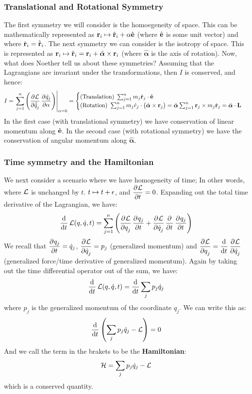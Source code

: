 \documentclass[../PHYS306Notes.tex]{subfiles}
\begin{document}
\subsubsection{Translational and Rotational Symmetry}
The first symmetry we will consider is the homoegeneity of space. This can be mathematically represented as $\mathbf{r}_i \mapsto \tilde{\mathbf{r}}_i + \alpha\hat{\mathbf{e}}$ (where $\hat{\mathbf{e}}$ is some unit vector) and where $\dot{\mathbf{r}}_i = \dot{\tilde{\mathbf{r}}}_i$. 
\newline The next symmetry we can consider is the isotropy of space. This is represented as $\mathbf{r}_i \mapsto \tilde{\mathbf{r}}_i = \mathbf{r}_i + \hat{\bm{\alpha}}\times \mathbf{r}_i$ (where $\hat{\bm{\alpha}}$ is the axis of rotation). 
\newline Now, what does Noether tell us about these symmetries? Assuming that the Lagrangians are invariant under the transformations, then $I$ is conserved, and hence:
\[I = \left.\sum_{j=1}^n\left(\dpd{\LL}{\dot{\tilde{q}}_j}\dpd{\tilde{q}_j}{\alpha}\right)\right|_{\alpha=0} = \begin{cases}
\text{(Translation) } \sum_{j=1}^n m_j\dot{\v{r}}_j \cdot \ehat
\\ \text{(Rotation) } \sum_{j=1}^nm_j\dot{r}_j \cdot\left(\hat{\bm{\alpha}} \times \v{r}_j\right) = \hat{\bm{\alpha}}\sum_{j=1}^n \v{r}_j \times m_j \dot{\v{r}}_j
= \hat{\bm{\alpha}}\cdot\v{L}\end{cases}\]
In the first case (with translational symmetry) we have conservation of linear momentum along $\hat{\mathbf{e}}$. In the second case (with rotational symmetry) we have the conservation of angular momentum along $\hat{\bm{\alpha}}$.
\subsubsection{Time symmetry and the Hamiltonian}
We next consider a scenario where we have homogeneity of time; In other words, where $\mathcal{L}$ is unchanged by $t$. $t \mapsto t + \epsilon$, and $\dpd{\LL}{t} = 0$. Expanding out the total time derivative of the Lagrangian, we have:
\[\dod{}{t}\LL(q, \dot{q}, t) = \sum_{j=1}^n \left(\dpd{\LL}{q_j}\dpd{q_j}{t} + \dpd{\LL}{\dot{q}_j}\dpd{}{t}\dpd{q_j}{t}\right)\]
We recall that $\dpd{q_j}{t} = \dot{q}_j$, $\dpd{\LL}{\dot{q}_j} = p_j$ (generalized momentum) and $\dpd{\LL}{q_j} = \dod{}{t}\dpd{\LL}{\dot{q}_j}$ (generalized force/time derivative of generalized momentum). Again by taking out the time differential operator out of the sum, we have:
\[\dod{}{t}\LL(q, \dot{q}, t) = \dod{}{t}\sum_jp_j\dot{q}_j\]
where $p_j$ is the generalized momentum of the coordinate $q_j$. We can write this as:
\[\dod{}{t}\left(\sum_jp_j\dot{q}_j - \LL\right) = 0\]
And we call the term in the brakets to be the \textbf{Hamiltonian}:
\[\mathcal{H} = \sum_jp_j\dot{q}_j - \mathcal{L}\]
which is a conserved quantity.
\end{document}
